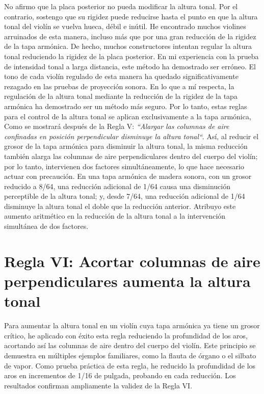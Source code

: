 \documentclass[12pt]{book}
\begin{document}
No afirmo que la placa posterior no pueda modificar la altura tonal. Por el contrario, sostengo que su rigidez puede reducirse hasta el punto en que la altura tonal del violín se vuelva hueca, débil e inútil. He encontrado muchos violines arruinados de esta manera, incluso más que por una gran reducción de la rigidez de la tapa armónica. De hecho, muchos constructores intentan regular la altura tonal reduciendo la rigidez de la placa posterior. En mi experiencia con la prueba de intensidad tonal a larga distancia, este método ha demostrado ser erróneo. El tono de cada violín regulado de esta manera ha quedado significativamente rezagado en las pruebas de proyección sonora. En lo que a mí respecta, la regulación de la altura tonal mediante la reducción de la rigidez de la tapa armónica ha demostrado ser un método más seguro. Por lo tanto, estas reglas para el control de la altura tonal se aplican exclusivamente a la tapa armónica, Como se mostrará después de la Regla V: \textit{``Alargar las columnas de aire confinadas en posición perpendicular disminuye la altura tonal``}. Así, al reducir el grosor de la tapa armónica para disminuir la altura tonal, la misma reducción también alarga las columnas de aire perpendiculares dentro del cuerpo del violín; por lo tanto, intervienen dos factores simultáneamente, lo que hace necesario actuar con precaución. En una tapa armónica de madera sonora, con un grosor reducido a 8/64, una reducción adicional de 1/64 causa una disminución perceptible de la altura tonal; y, desde 7/64, una reducción adicional de 1/64 disminuye la altura tonal el doble que la reducción anterior. Atribuyo este aumento aritmético en la reducción de la altura tonal a la intervención simultánea de dos factores.

\section*{Regla VI: Acortar columnas de aire perpendiculares aumenta la altura tonal}

Para aumentar la altura tonal en un violín cuya tapa armónica ya tiene un grosor crítico, he aplicado con éxito esta regla reduciendo la profundidad de los aros, acortando así las columnas de aire dentro del cuerpo del violín. Este principio se demuestra en múltiples ejemplos familiares, como la flauta de órgano o el silbato de vapor. Como prueba práctica de esta regla, he reducido la profundidad de los aros en incrementos de 1/16 de pulgada, probando en cada reducción. Los resultados confirman ampliamente la validez de la Regla VI.
\end{document}
